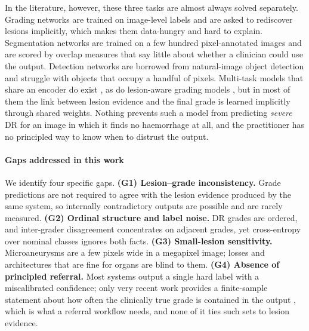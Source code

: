 In the literature, however, these three tasks are almost always solved separately. Grading networks are trained on image-level labels and are asked to rediscover lesions implicitly, which makes them data-hungry and hard to explain. Segmentation networks are trained on a few hundred pixel-annotated images and are scored by overlap measures that say little about whether a clinician could use the output. Detection networks are borrowed from natural-image object detection and struggle with objects that occupy a handful of pixels. Multi-task models that share an encoder do exist \citep{foo2020multitask,playout2019,zhou2019collab,vijayalakshmi2025multitask}, as do lesion-aware grading models \citep{wang2017zoomin,sun2021lat,huang2021lesioncl,liu2023crosslesion}, but in most of them the link between lesion evidence and the final grade is learned implicitly through shared weights. Nothing prevents such a model from predicting \emph{severe} DR for an image in which it finds no haemorrhage at all, and the practitioner has no principled way to know when to distrust the output.

\paragraph{Gaps addressed in this work} We identify four specific gaps. \textbf{(G1) Lesion--grade inconsistency.} Grade predictions are not required to agree with the lesion evidence produced by the same system, so internally contradictory outputs are possible and are rarely measured. \textbf{(G2) Ordinal structure and label noise.} DR grades are ordered, and inter-grader disagreement concentrates on adjacent grades, yet cross-entropy over nominal classes ignores both facts. \textbf{(G3) Small-lesion sensitivity.} Microaneurysms are a few pixels wide in a megapixel image; losses and architectures that are fine for organs are blind to them. \textbf{(G4) Absence of principled referral.} Most systems output a single hard label with a miscalibrated confidence; only very recent work provides a finite-sample statement about how often the clinically true grade is contained in the output \citep{hasan2026ordinalcp}, which is what a referral workflow needs, and none of it ties such sets to lesion evidence.

